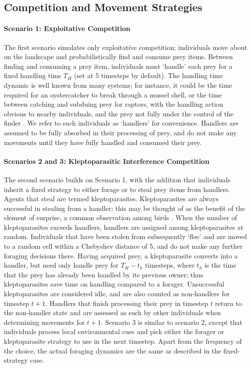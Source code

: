 \documentclass[11pt]{article}
\begin{document}
\subsection{Competition and Movement Strategies}

\paragraph{Scenario 1: Exploitative Competition}

The first scenario simulates only exploitative competition; individuals move about on the landscape and probabilistically find and consume prey items.
Between finding and consuming a prey item, individuals must `handle' each prey for a fixed handling time $T_H$ (set at 5 timesteps by default).
The handling time dynamic is well known from many systems; for instance, it could be the time required for an oystercatcher to break through a mussel shell,
or the time between catching and subduing prey for raptors, with the handling action obvious to nearby individuals, and the prey not fully under the control of the finder \citep{brockmann1979}.
We refer to such individuals as `handlers' for convenience.
Handlers are assumed to be fully absorbed in their processing of prey, and do not make any movements until they have fully handled and consumed their prey.

\paragraph{Scenarios 2 and 3: Kleptoparasitic Interference Competition}

The second scenario builds on Scenario 1, with the addition that individuals inherit a fixed strategy to either forage or to steal prey items from handlers.
Agents that steal are termed kleptoparasites.
Kleptoparasites are always successful in stealing from a handler; this may be thought of as the benefit of the element of surprise, a common observation among birds \citep{brockmann1979}.
When the number of kleptoparasites exceeds handlers, handlers are assigned among kleptoparasites at random.
Individuals that have been stolen from subsequently `flee' and are moved to a random cell within a Chebyshev distance of 5, and do not make any further foraging decisions there.
Having acquired prey, a kleptoparasite converts into a handler, but need only handle prey for $T_H - t_h$ timesteps, where $t_h$ is the time that the prey has already been handled by its previous owner; thus kleptoparasites save time on handling compared to a forager.
Unsuccessful kleptoparasites are considered idle, and are also counted as non-handlers for timestep $t+1$.
Handlers that finish processing their prey in timestep $t$ return to the non-handler state and are assessed as such by other individuals when determining movements for $t+1$.
Scenario 3 is similar to scenario 2, except that individuals process local environmental cues and pick either the forager or kleptoparasite strategy to use in the next timestep.
Apart from the frequency of the choice, the actual foraging dynamics are the same as described in the fixed-strategy case.
\end{document}
